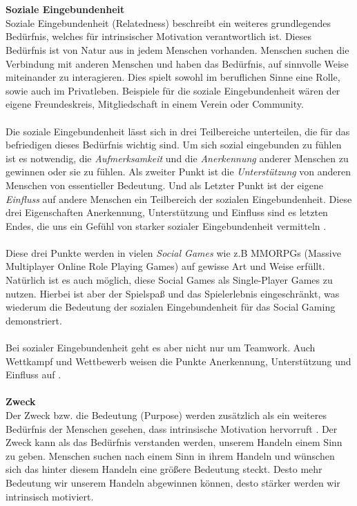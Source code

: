 \documentclass[a4paper,12pt]{scrartcl}
\begin{document}
\\\\
\textbf{Soziale Eingebundenheit}\\
Soziale Eingebundenheit (Relatedness) beschreibt ein weiteres grundlegendes Bedürfnis, welches für intrinsischer Motivation verantwortlich ist. Dieses Bedürfnis ist von Natur aus in jedem Menschen vorhanden. Menschen suchen die Verbindung mit anderen Menschen und haben das Bedürfnis, auf sinnvolle Weise miteinander zu interagieren. Dies spielt sowohl im beruflichen Sinne eine Rolle, sowie auch im Privatleben. Beispiele für die soziale Eingebundenheit wären der eigene Freundeskreis, Mitgliedschaft in einem Verein oder Community. 
\\\\
Die soziale Eingebundenheit lässt sich in drei Teilbereiche unterteilen, die für das befriedigen dieses Bedürfnis wichtig sind. Um sich sozial eingebunden zu fühlen ist es notwendig, die \textit{Aufmerksamkeit} und die \textit{Anerkennung} anderer Menschen zu gewinnen oder sie zu fühlen. Als zweiter Punkt ist die \textit{Unterstützung} von anderen Menschen von essentieller Bedeutung. Und als Letzter Punkt ist der eigene \textit{Einfluss} auf andere Menschen ein Teilbereich der sozialen Eingebundenheit. Diese drei Eigenschaften Anerkennung, Unterstützung und Einfluss sind es letzten Endes, die uns ein Gefühl von starker sozialer Eingebundenheit vermitteln \cite{Rigby2011}.
\\\\
Diese drei Punkte werden in vielen \textit{Social Games} wie z.B MMORPGs (Massive Multiplayer Online Role Playing Games) auf gewisse Art und Weise erfüllt. Natürlich ist es auch möglich, diese Social Games als Single-Player Games zu nutzen. Hierbei ist aber der Spielspaß und das Spielerlebnis eingeschränkt, was wiederum die Bedeutung der sozialen Eingebundenheit für das Social Gaming demonstriert.
\\\\
Bei sozialer Eingebundenheit geht es aber nicht nur um Teamwork. Auch Wettkampf und Wettbewerb weisen die Punkte Anerkennung, Unterstützung und Einfluss auf \cite{Rigby2011}.
\\\\
\textbf{Zweck}\\
Der Zweck bzw. die Bedeutung (Purpose) werden zusätzlich als ein weiteres Bedürfnis der Menschen gesehen, dass intrinsische Motivation hervorruft \cite{Pink2010}. Der Zweck kann als das Bedürfnis verstanden werden, unserem Handeln einem Sinn zu geben. Menschen suchen nach einem Sinn in ihrem Handeln und wünschen sich das hinter diesem Handeln eine größere Bedeutung steckt. Desto mehr Bedeutung wir unserem Handeln abgewinnen können, desto stärker werden wir intrinsisch motiviert. 
\end{document}
